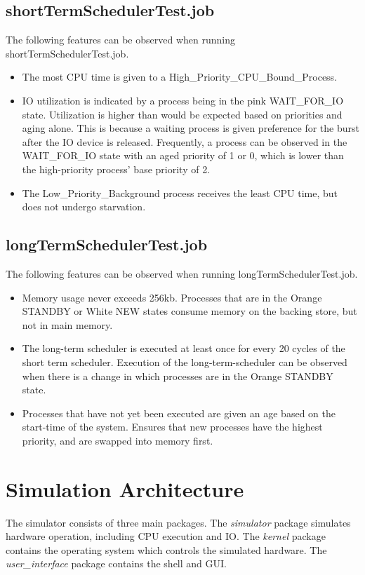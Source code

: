 \documentclass[paper=a4, fontsize=11pt]{scrartcl} %
\numberwithin{equation}{section} %
\numberwithin{figure}{section} %
\numberwithin{table}{section} %
\begin{document}
\subsection{shortTermSchedulerTest.job}
The following features can be observed when running shortTermSchedulerTest.job.
\begin{itemize}
	\item The most CPU time is given to a High\_Priority\_CPU\_Bound\_Process.
	\item IO utilization is indicated by a process being in the pink WAIT\_FOR\_IO state. Utilization is higher than would be expected based on priorities and aging alone. This is because a waiting process is given preference for the burst after the IO device is released. Frequently, a process can be observed in the WAIT\_FOR\_IO state with an aged priority of 1 or 0, which is lower than the high-priority process' base priority of 2.
	\item The Low\_Priority\_Background process receives the least CPU time, but does not undergo starvation.
\end{itemize}

\subsection{longTermSchedulerTest.job}
The following features can be observed when running longTermSchedulerTest.job.
\begin{itemize}
	\item Memory usage never exceeds 256kb. Processes that are in the Orange STANDBY or White NEW states consume memory on the backing store, but not in main memory.
	\item The long-term scheduler is executed at least once for every 20 cycles of the short term scheduler. Execution of the long-term-scheduler can be observed when there is a change in which processes are in the Orange STANDBY state.
	\item Processes that have not yet been executed are given an age based on the start-time of the system. Ensures that new processes have the highest priority, and are swapped into memory first.
\end{itemize}


\section{Simulation Architecture}

The simulator consists of three main packages. The \textit{simulator} package simulates hardware operation, including CPU execution and IO. The \textit{kernel} package contains the operating system which controls the simulated hardware. The \textit{user\_interface} package contains the shell and GUI.
\end{document}
